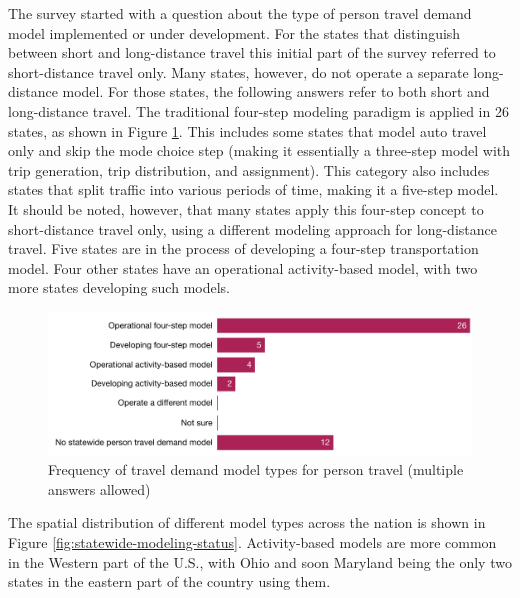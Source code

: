 The survey started with a question about the type of person travel demand model implemented or under development. For the states that distinguish between short and long-distance travel this initial part of the survey referred to short-distance travel only. Many states, however, do not operate a separate long-distance model. For those states, the following answers refer to both short and long-distance travel. The traditional four-step modeling paradigm is applied in 26 states, as shown in Figure \ref{fig:person-model-frequency}. This includes some states that model auto travel only and skip the mode choice step (making it essentially a three-step model with trip generation, trip distribution, and assignment). This category also includes states that split traffic into various periods of time, making it a five-step model. It should be noted, however, that many states apply this four-step concept to short-distance travel only, using a different modeling approach for long-distance travel. Five states are in the process of developing a four-step transportation model. Four other states have an operational activity-based model, with two more states developing such models.

\begin{figure}
\centering
\includegraphics[scale=0.65]{graphics/05-person-demand-model-types}
\caption[Frequency of travel demand model types for person travel]{Frequency of travel demand model types for person travel (multiple answers allowed)}
\label{fig:person-model-frequency}
\end{figure}

The spatial distribution of different model types across the nation is shown in Figure \ref{fig:statewide-modeling-status}. Activity-based models are more common in the Western part of the U.S., with Ohio and soon Maryland being the only two states in the eastern part of the country using them.

